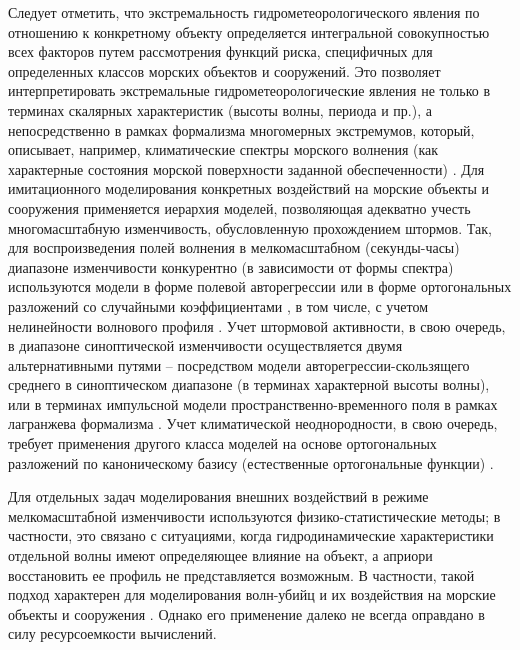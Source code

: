 Следует отметить, что экстремальность гидрометеорологического явления по отношению к конкретному объекту определяется интегральной совокупностью всех факторов путем рассмотрения функций риска, специфичных для определенных классов морских объектов и сооружений. Это позволяет интерпретировать экстремальные гидрометеорологические явления не только в терминах скалярных характеристик (высоты волны, периода и пр.), а непосредственно в рамках формализма многомерных экстремумов, который, описывает, например, климатические спектры морского волнения (как характерные состояния морской поверхности заданной обеспеченности) \citep{dk4}\citep{dk5}.
Для имитационного моделирования конкретных воздействий на морские объекты и сооружения применяется иерархия моделей, позволяющая адекватно учесть многомасштабную изменчивость, обусловленную прохождением штормов. Так, для воспроизведения полей волнения в мелкомасштабном (секунды-часы) диапазоне изменчивости конкурентно (в зависимости от формы спектра) используются модели в форме полевой авторегрессии \citep{dk6} или в форме ортогональных разложений со случайными коэффициентами \citep{dk7}, в том числе, с учетом нелинейности волнового профиля \citep{dk8}. Учет штормовой активности, в свою очередь, в диапазоне синоптической изменчивости осуществляется двумя альтернативными путями – посредством модели авторегрессии-скользящего среднего \citep{dk9} в синоптическом диапазоне (в терминах характерной высоты волны), или в терминах импульсной модели пространственно-временного поля в рамках лагранжева формализма \citep{dk10}. Учет климатической неоднородности, в свою очередь, требует применения другого класса моделей на основе ортогональных разложений по каноническому базису (естественные ортогональные функции) \citep{dk11}.

Для отдельных задач моделирования внешних воздействий в режиме мелкомасштабной изменчивости используются физико-статистические методы; в частности, это связано с ситуациями, когда гидродинамические характеристики отдельной волны имеют определяющее влияние на объект, а априори восстановить ее профиль не представляется возможным. В частности, такой подход характерен для моделирования волн-убийц и их воздействия на морские объекты и сооружения \citep{dk12}\citep{dk13}. Однако его применение далеко не всегда оправдано в силу ресурсоемкости вычислений.

